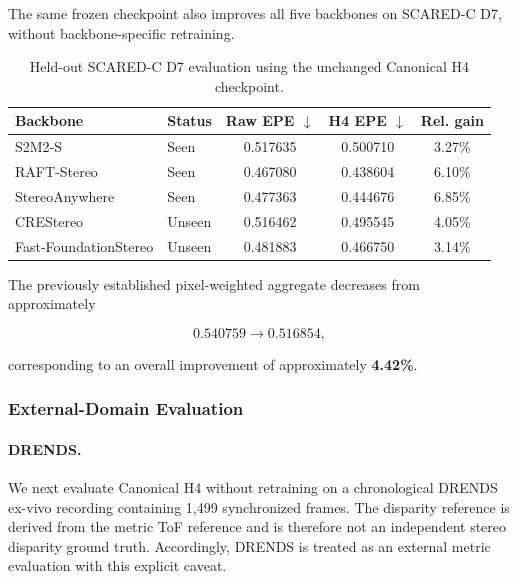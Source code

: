 \documentclass[11pt,a4paper]{article}
\begin{document}
The same frozen checkpoint also improves all five backbones on
SCARED-C D7, without backbone-specific retraining.

\begin{table}[t]
    \centering
    \caption{
        Held-out SCARED-C D7 evaluation using the unchanged Canonical H4
        checkpoint.
    }
    \label{tab:scared_d7_current}
    \small
    \begin{tabular}{llccc}
        \toprule
        Backbone & Status &
        Raw EPE $\downarrow$ &
        H4 EPE $\downarrow$ &
        Rel. gain \\
        \midrule
        S2M2-S
            & Seen
            & 0.517635 & 0.500710 & 3.27\% \\

        RAFT-Stereo
            & Seen
            & 0.467080 & 0.438604 & 6.10\% \\

        StereoAnywhere
            & Seen
            & 0.477363 & 0.444676 & 6.85\% \\

        CREStereo
            & Unseen
            & 0.516462 & 0.495545 & 4.05\% \\

        Fast-FoundationStereo
            & Unseen
            & 0.481883 & 0.466750 & 3.14\% \\
        \bottomrule
    \end{tabular}
\end{table}

The previously established pixel-weighted aggregate decreases from
approximately

\[
0.540759 \rightarrow 0.516854,
\]

corresponding to an overall improvement of approximately
\textbf{4.42\%}.


\subsubsection{External-Domain Evaluation}

\paragraph{DRENDS.}
We next evaluate Canonical H4 without retraining on a chronological
DRENDS ex-vivo recording containing 1,499 synchronized frames.
The disparity reference is derived from the metric ToF reference and is
therefore not an independent stereo disparity ground truth.
Accordingly, DRENDS is treated as an external metric evaluation with this
explicit caveat.
\end{document}
